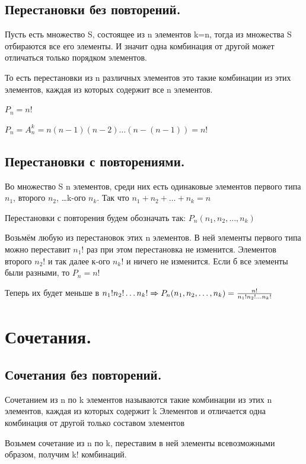 \documentclass[12pt, a4paper]{article}
\begin{document}
\subsection{Перестановки без повторений.}

Пусть есть множество S, состоящее из n элементов k=n, тогда из множества S отбираются все его элементы. И значит одна комбинация от другой  может отличаться только порядком элементов.

То есть перестановки из n различных элементов это такие комбинации из этих элементов, каждая из которых содержит все n элементов.

$P_n=n!$


$P_n = A_n^k = n(n-1)(n-2)\dots(n-(n-1)) = n!$

\subsection{Перестановки с повторениями.}

Во множество S n элементов, среди них есть одинаковые элементов первого типа $n_1$, второго $n_2$, \dots k-ого $n_k$. Так что $n_1+n_2+\dots +n_k=n$

Перестановки с повторения будем обозначать так: $P_n(n_1,n_2,\dots ,n_k)$

Возьмём любую из перестановок этих n элементов. В ней элементы первого типа можно переставит $n_1!$ раз при этом перестановка не изменится. Элементов второго $n_2!$ и так далее к-ого $n_k!$ и ничего не изменится. Если б все элементы были разными, то $P_n=n!$

Теперь их будет меньше в $n_1!n_2!\dots n_k! \xRightarrow[]{} P_n(n_1,n_2,\dots, n_k) =  \frac{n!}{n_1!n_2!\dots n_k!} $

\section{Сочетания.}

\subsection{Сочетания без повторений.}

Сочетанием из n по k элементов называются такие комбинации из этих n элементов, каждая из которых содержит k Элементов и отличается одна комбинация от другой только составом элементов

Возьмем сочетание из n по k, переставим в ней элементы всевозможными образом, получим k! комбинаций. 
\end{document}
